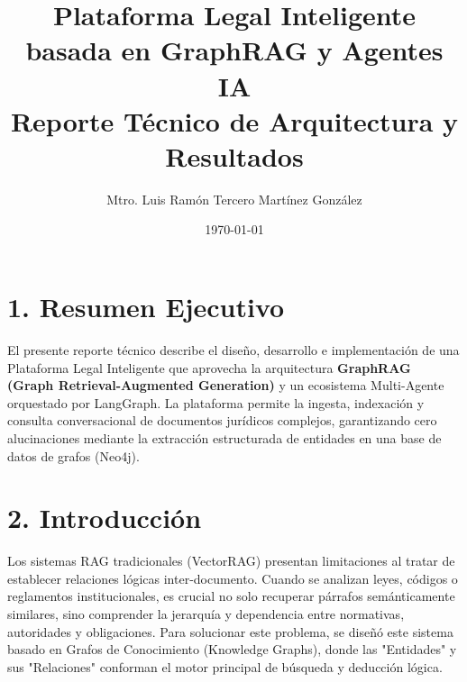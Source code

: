 \documentclass[12pt,a4paper]{article}
\title{Plataforma Legal Inteligente basada en GraphRAG y Agentes IA\\
\large Reporte Técnico de Arquitectura y Resultados}
\author{Mtro. Luis Ramón Tercero Martínez González}
\date{\today}
\begin{document}
\maketitle

\section*{1. Resumen Ejecutivo}
El presente reporte técnico describe el diseño, desarrollo e implementación de una Plataforma Legal Inteligente que aprovecha la arquitectura \textbf{GraphRAG (Graph Retrieval-Augmented Generation)} y un ecosistema Multi-Agente orquestado por LangGraph. La plataforma permite la ingesta, indexación y consulta conversacional de documentos jurídicos complejos, garantizando cero alucinaciones mediante la extracción estructurada de entidades en una base de datos de grafos (Neo4j).

\section*{2. Introducción}
Los sistemas RAG tradicionales (VectorRAG) presentan limitaciones al tratar de establecer relaciones lógicas inter-documento. Cuando se analizan leyes, códigos o reglamentos institucionales, es crucial no solo recuperar párrafos semánticamente similares, sino comprender la jerarquía y dependencia entre normativas, autoridades y obligaciones. Para solucionar este problema, se diseñó este sistema basado en Grafos de Conocimiento (Knowledge Graphs), donde las "Entidades" y sus "Relaciones" conforman el motor principal de búsqueda y deducción lógica.
\end{document}
